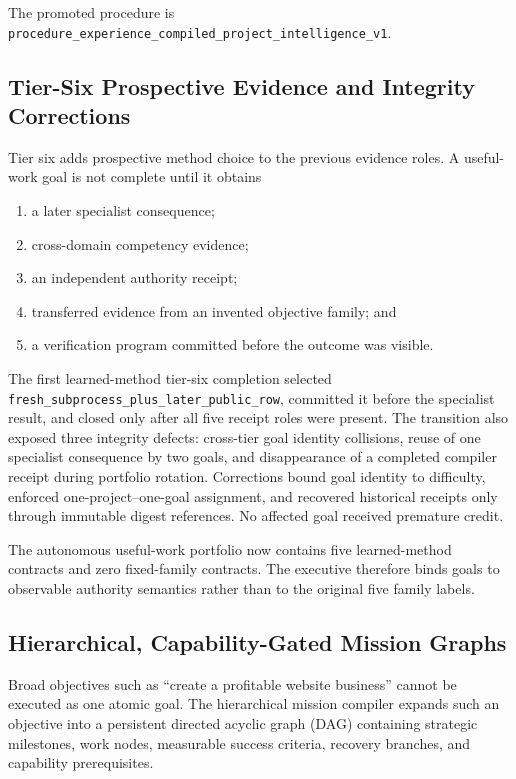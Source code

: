 The promoted procedure is
\texttt{procedure\_experience\_compiled\_project\_intelligence\_v1}.

\subsection{Tier-Six Prospective Evidence and Integrity Corrections}
\label{subsec:tier-six-prospective-evidence}

Tier six adds prospective method choice to the previous evidence roles.  A
useful-work goal is not complete until it obtains
\begin{enumerate}
    \item a later specialist consequence;
    \item cross-domain competency evidence;
    \item an independent authority receipt;
    \item transferred evidence from an invented objective family; and
    \item a verification program committed before the outcome was visible.
\end{enumerate}

The first learned-method tier-six completion selected
\texttt{fresh\_subprocess\_plus\_later\_public\_row}, committed it before the
specialist result, and closed only after all five receipt roles were present.
The transition also exposed three integrity defects: cross-tier goal identity
collisions, reuse of one specialist consequence by two goals, and disappearance
of a completed compiler receipt during portfolio rotation.  Corrections bound
goal identity to difficulty, enforced one-project--one-goal assignment, and
recovered historical receipts only through immutable digest references.  No
affected goal received premature credit.

The autonomous useful-work portfolio now contains five learned-method contracts
and zero fixed-family contracts.  The executive therefore binds goals to
observable authority semantics rather than to the original five family labels.

\subsection{Hierarchical, Capability-Gated Mission Graphs}
\label{subsec:hierarchical-mission-graphs}

Broad objectives such as ``create a profitable website business'' cannot be
executed as one atomic goal.  The hierarchical mission compiler expands such an
objective into a persistent directed acyclic graph (DAG) containing strategic
milestones, work nodes, measurable success criteria, recovery branches, and
capability prerequisites.

